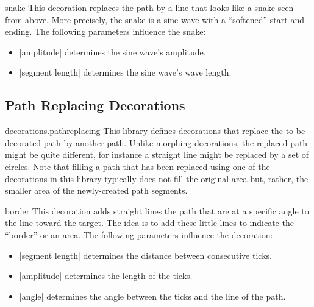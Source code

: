 \begin{decoration}{snake}
  This decoration replaces the path by a line that looks like a snake
  seen from above. More precisely, the snake is a sine wave with a
  ``softened'' start and ending. The following parameters influence
  the snake:
  \begin{itemize}
  \item |amplitude|
    determines the sine wave's amplitude.
  \item |segment length|
    determines the sine wave's wave length.
  \end{itemize}
\begin{codeexample}[]
\end{codeexample}
\end{decoration}




\subsection{Path Replacing Decorations}

\begin{pgflibrary}{decorations.pathreplacing}
  This library defines decorations that replace the to-be-decorated
  path by another path. Unlike morphing decorations, the replaced path
  might be quite different, for instance a straight line might be
  replaced by a set of circles. Note that filling a path that has been
  replaced using one of the decorations in this library typically does
  not fill the original area but, rather, the smaller area of the
  newly-created path segments.
\end{pgflibrary}

\begin{decoration}{border}
  This decoration adds straight lines the path that are at a specific
  angle to the line toward the target. The idea is to add these little
  lines to indicate the ``border'' or an area. The following
  parameters influence the decoration:
  \begin{itemize}
  \item |segment length|
    determines the distance between consecutive ticks.
  \item |amplitude|
    determines the length of the ticks.
  \item |angle|
    determines the angle between the ticks and the line of the path.
  \end{itemize}
\begin{codeexample}[]
\end{codeexample}
\end{decoration}


